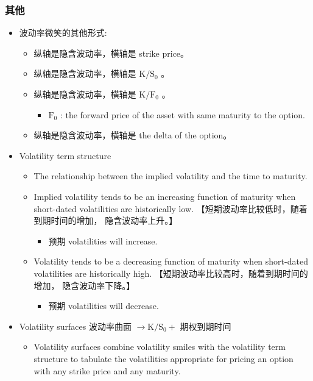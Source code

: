 \subsubsection{其他}

\begin{itemize}
\item 波动率微笑的其他形式:
    \begin{itemize}    
    \item 纵轴是隐含波动率，横轴是 strike price。
    \item 纵轴是隐含波动率，横轴是 \(\mathrm{K}/{\mathrm{S}}_{0}\) 。
    \item 纵轴是隐含波动率，横轴是 \(\mathrm{K}/{\mathrm{F}}_{0}\) 。
        \begin{itemize}    
        \item \({\mathrm{F}}_{0}\) : the forward price of the asset with same maturity to the option. 
        \end{itemize}
    \item 纵轴是隐含波动率，横轴是 the delta of the option。
    \end{itemize}
\item Volatility term structure
    \begin{itemize} 
    \item The relationship between the implied volatility and the time to maturity.
    \item Implied volatility tends to be an increasing function of maturity when short-dated volatilities are historically low. 【短期波动率比较低时，随着到期时间的增加， 隐含波动率上升。】
        \begin{itemize}    
        \item     预期 volatilities will increase.
        \end{itemize}
    \item Volatility tends to be a decreasing function of maturity when short-dated volatilities are historically high. 【短期波动率比较高时，随着到期时间的增加， 隐含波动率下降。】
        \begin{itemize}    
        \item     预期 volatilities will decrease.
        \end{itemize}
    \end{itemize}
\item Volatility surfaces 波动率曲面 \(\rightarrow  \mathrm{K}/{\mathrm{S}}_{0} +\) 期权到期时间
    \begin{itemize} 
    \item Volatility surfaces combine volatility smiles with the volatility term structure to tabulate the volatilities appropriate for pricing an option with any strike price and any maturity.
    

\end{itemize}
\end{itemize}
